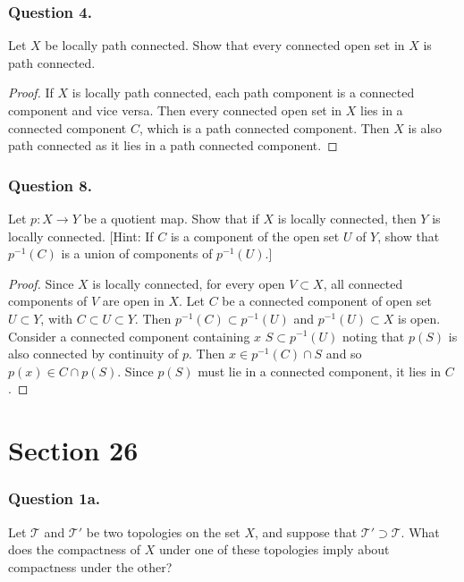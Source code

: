 \documentclass[12pt]{article}
\begin{document}

\subsubsection*{Question 4.}
Let $X$ be locally path connected. Show that every connected open set 
in $X$ is path connected.
\begin{proof}
    If $X$ is locally path connected, 
    each path component is a connected component and vice versa.
    Then every connected open set in $X$ lies in a connected component $C$,
    which is a path connected component. Then $X$ is also path connected as 
    it lies in a path connected component. 
    
\end{proof}

\subsubsection*{Question 8.}
Let \( p : X \to Y \) be a quotient map. Show that if 
\( X \) is locally connected, then \( Y \)
is locally connected. [Hint: If \( C \) is a component of 
the open set \( U \) of \( Y \), show
that \( p^{-1}(C) \) is a union of components 
of \( p^{-1}(U) \).]

\begin{proof}
    Since $X$ is locally connected, for every open 
    $V \subset X$, all connected
    components of $V$ are open in $X$.
    Let $C$ be a connected component of open set $U \subset Y$,
    with $C \subset U \subset Y$.
    Then $p^{-1}(C) \subset p^{-1}(U)$ and $p^{-1}(U) \subset X$
    is open. Consider a connected component containing $x$
    $S \subset p^{-1}(U)$ noting that $p(S)$ is also connected by continuity of $p$.
    Then $x \in p^{-1}(C) \cap S$ and so $p(x) \in C \cap p(S)$.
    Since $p(S)$ must lie in a connected component, it lies in $C$.
    

\end{proof}
\section{Section 26}
\subsubsection*{Question 1a.}
Let \( \mathcal{T} \) and \( \mathcal{T}' \) be two topologies 
on the set \( X \), and suppose that \( \mathcal{T}' \supset \mathcal{T} \). 
What does the compactness of \( X \) under one of these topologies imply about compactness under the other? 
\end{document}
